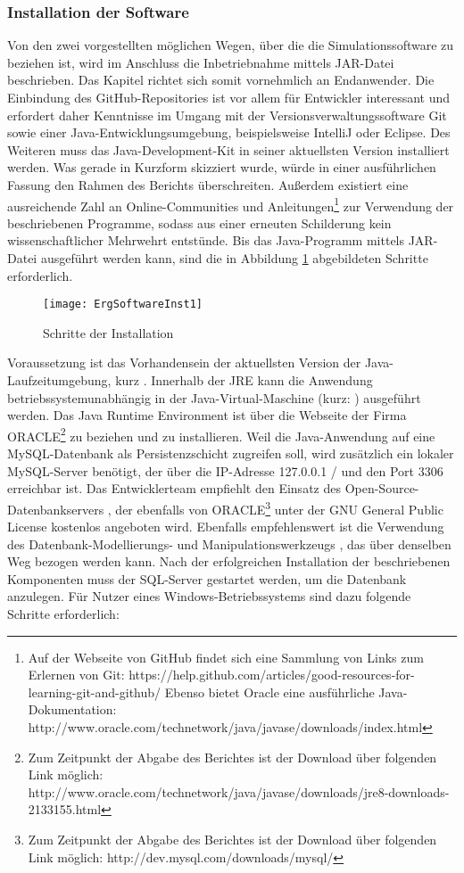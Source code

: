 \subsubsection{Installation der Software}
Von den zwei vorgestellten möglichen Wegen, über die die Simulationssoftware zu beziehen ist, wird im Anschluss die Inbetriebnahme mittels JAR-Datei beschrieben. Das Kapitel richtet sich somit vornehmlich an Endanwender.
Die Einbindung des GitHub-Repositories ist vor allem für Entwickler interessant und erfordert daher Kenntnisse im Umgang mit der Versionsverwaltungssoftware Git sowie einer Java-Entwicklungsumgebung, beispielsweise IntelliJ oder Eclipse. Des Weiteren muss das Java-Development-Kit in seiner aktuellsten Version installiert werden. Was gerade in Kurzform skizziert wurde, würde in einer ausführlichen Fassung den Rahmen des Berichts überschreiten. Außerdem existiert eine ausreichende Zahl an Online-Communities und Anleitungen\footnote{Auf der Webseite von GitHub findet sich eine Sammlung von Links zum Erlernen von Git: https://help.github.com/articles/good-resources-for-learning-git-and-github/
Ebenso bietet Oracle eine ausführliche Java-Dokumentation: http://www.oracle.com/technetwork/java/javase/downloads/index.html} zur Verwendung der beschriebenen Programme, sodass aus einer erneuten Schilderung kein wissenschaftlicher Mehrwehrt entstünde.
Bis das Java-Programm mittels JAR-Datei ausgeführt werden kann, sind die in Abbildung \ref{fig:ErgSoftwareInst1} abgebildeten Schritte erforderlich.
\begin{figure}[htb]
	\centering
	\texttt{[image: ErgSoftwareInst1]}
	\caption{Schritte der Installation}
	\label{fig:ErgSoftwareInst1}
\end{figure}
Voraussetzung ist das Vorhandensein der aktuellsten Version der Java-Laufzeitumgebung, kurz . Innerhalb der JRE kann die Anwendung betriebssystemunabhängig in der Java-Virtual-Maschine (kurz: ) ausgeführt werden. Das Java Runtime Environment ist über die Webseite der Firma ORACLE\footnote{Zum Zeitpunkt der Abgabe des Berichtes ist der Download über folgenden Link möglich: http://www.oracle.com/technetwork/java/javase/downloads/jre8-downloads-2133155.html} zu beziehen und zu installieren.
Weil die Java-Anwendung auf eine MySQL-Datenbank als Persistenzschicht zugreifen soll, wird zusätzlich ein lokaler MySQL-Server benötigt, der über die IP-Adresse 127.0.0.1 /  und den Port 3306 erreichbar ist. Das Entwicklerteam empfiehlt den Einsatz des Open-Source-Datenbankservers , der ebenfalls von ORACLE\footnote{Zum Zeitpunkt der Abgabe des Berichtes ist der Download über folgenden Link möglich: http://dev.mysql.com/downloads/mysql/} unter der GNU General Public License kostenlos angeboten wird. Ebenfalls empfehlenswert ist die Verwendung des Datenbank-Modellierungs- und Manipulationswerkzeugs , das über denselben Weg bezogen werden kann.
Nach der erfolgreichen Installation der beschriebenen Komponenten muss der SQL-Server gestartet werden, um die Datenbank anzulegen. Für Nutzer eines Windows-Betriebssystems sind dazu folgende Schritte erforderlich:

